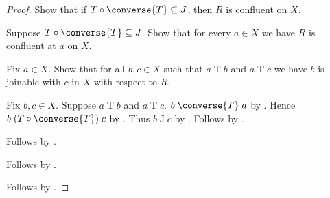 \begin{proof}
    Show that if $T\circ\converse{T}\subseteq J$, then
        $R$ is confluent on $X$.
    \begin{subproof}
        Suppose $T\circ\converse{T}\subseteq J$.
        Show that for every $a\in X$ we have $R$ is confluent at $a$ on $X$.
        \begin{subproof}
            Fix $a\in X$.
            Show that for all $b,c\in X$ such that
                $a\mathrel{T}b$ and $a\mathrel{T}c$ we have
                $b$ is joinable with $c$ in $X$ with respect to $R$.
            \begin{subproof}
                Fix $b,c\in X$.
                Suppose $a\mathrel{T}b$ and $a\mathrel{T}c$.
                $b\mathrel{\converse{T}}a$ by .
                Hence $b\mathrel{(T\circ\converse{T})}c$
                    by .
                Thus $b\mathrel{J}c$ by .
                Follows by .
            \end{subproof}
            Follows by .
        \end{subproof}
        Follows by .
    \end{subproof}
    Follows by \auto.
\end{proof}

